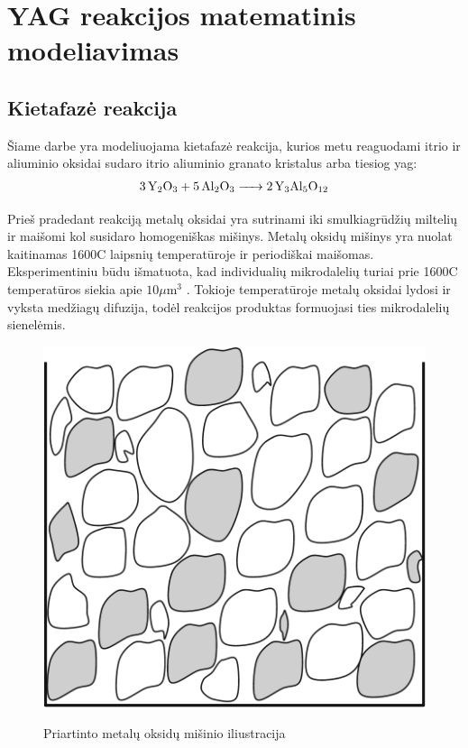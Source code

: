 
\section{YAG reakcijos matematinis modeliavimas}

% 



\subsection{Kietafazė reakcija}

Šiame darbe yra modeliuojama kietafazė reakcija, kurios metu reaguodami itrio ir aliuminio oksidai sudaro itrio aliuminio granato kristalus arba tiesiog \acs{yag}:
\begin{align*}
  \ce{3Y_2O_3 + 5Al_2O_3 -> 2Y_3Al_5O_12}
\end{align*}

Prieš pradedant reakciją metalų oksidai yra sutrinami iki smulkiagrūdžių miltelių ir maišomi kol susidaro homogeniškas mišinys. Metalų oksidų mišinys yra nuolat kaitinamas 1600\degree C laipsnių temperatūroje ir periodiškai maišomas. Eksperimentiniu būdu išmatuota, kad individualių mikrodalelių turiai prie 1600\degree C temperatūros siekia apie $10\mu\text{m}^3$ \cite{ivanauskasComputationalModellingYAG2009}. Tokioje temperatūroje metalų oksidai lydosi ir vyksta medžiagų difuzija, todėl reakcijos produktas formuojasi ties mikrodalelių sienelėmis.

\begin{figure}[h]
  \centering
  \caption{Priartinto metalų oksidų mišinio iliustracija}
  \includegraphics[width=0.25\linewidth]{assets/metal_oxides_mixture.png}
  \label{fig:metal-oxides-mixuter}
\end{figure}

